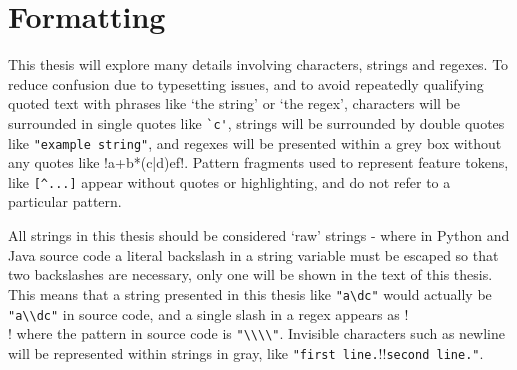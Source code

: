 \section{Formatting}
This thesis will explore many details involving characters, strings and regexes.  To reduce confusion due to typesetting issues, and to avoid repeatedly qualifying quoted text with phrases like `the string' or `the regex', characters will be surrounded in single quotes like \verb!`c'!, strings will be surrounded by double quotes like \verb!"example string"!, and regexes will be presented within a grey box without any quotes like \cverb!a+b*(c|d)e\1f!.  Pattern fragments used to represent feature tokens, like \verb![^...]! appear without quotes or highlighting, and do not refer to a particular pattern.

All strings in this thesis should be considered `raw' strings - where in Python and Java source code a literal backslash in a string variable must be escaped so that two backslashes are necessary, only one will be shown in the text of this thesis.  This means that a string presented in this thesis like \verb!"a\dc"! would actually be \verb!"a\\dc"! in source code, and a single slash in a regex appears as \cverb!\\! where the pattern in source code is \verb!"\\\\"!.  Invisible characters such as newline will be represented within strings in gray, like \verb!"first line.!\gverb!\n!\verb!second line."!.
